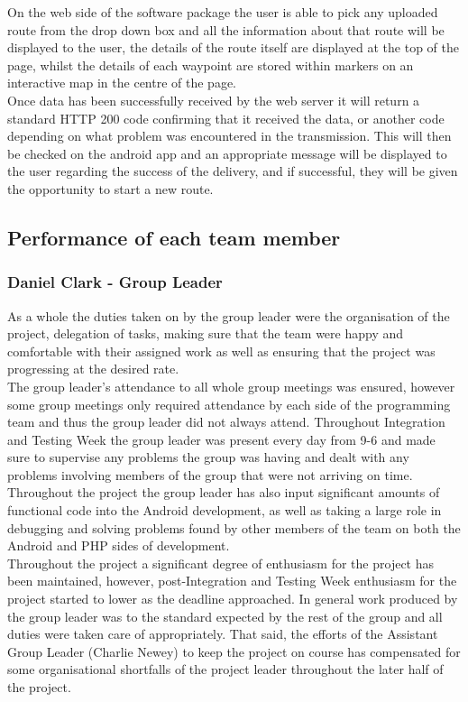 \documentclass{article}
\begin{document}
		On the web side of the software package the user is able to pick any uploaded route from the drop down box and all the information about that route will be displayed to the user, the details of the route itself are displayed at the top of the page, whilst the details of each waypoint are stored within markers on an interactive map in the centre of the page. \\
		
		Once data has been successfully received by the web server it will return a standard HTTP 200 code confirming that it received the data, or another code depending on what problem was encountered in the transmission. This will then be checked on the android app and an appropriate message will be displayed to the user regarding the success of the delivery, and if successful, they will be given the opportunity to start a new route.

	\clearpage
		\subsection{Performance of each team member}
		\subsubsection{Daniel Clark - Group Leader}
		As a whole the duties taken on by the group leader were the organisation of the project, delegation of tasks, making sure that the team were happy and comfortable with their assigned work as well as ensuring that the project was progressing at the desired rate. \\
		
		The group leader's attendance to all whole group meetings was ensured, however some group meetings only required attendance by each side of the programming team and thus the group leader did not always attend. Throughout Integration and Testing Week the group leader was present every day from 9-6 and made sure to supervise any problems the group was having and dealt with any problems involving members of the group that were not arriving on time. Throughout the project the group leader has also input significant amounts of functional code into the Android development, as well as taking a large role in debugging and solving problems found by other members of the team on both the Android and PHP sides of development. \\
		
		Throughout the project a significant degree of enthusiasm for the project has been maintained, however, post-Integration and Testing Week enthusiasm for the project started to lower as the deadline approached. In general work produced by the group leader was to the standard expected by the rest of the group and all duties were taken care of appropriately. That said, the efforts of the Assistant Group Leader (Charlie Newey) to keep the project on course has compensated for some organisational shortfalls of the project leader throughout the later half of the project. \\
		
\end{document}
